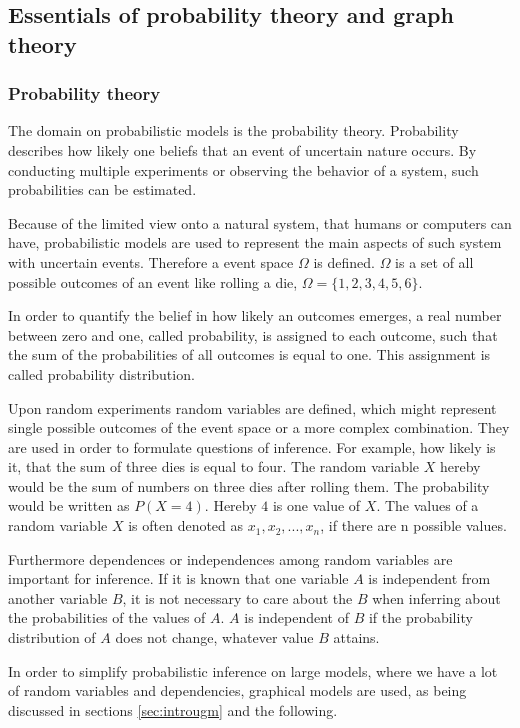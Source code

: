 \subsection{Essentials of probability theory and graph theory}

\subsubsection{Probability theory}

The domain on probabilistic models is the probability theory. Probability describes how likely one beliefs that an event of uncertain nature occurs. By conducting multiple experiments or observing the behavior of a system, such probabilities can be estimated.

Because of the limited view onto a natural system, that humans or computers can have, probabilistic models are used to represent the main aspects of such system with uncertain events. Therefore a event space $\Omega$ is defined. $\Omega$ is a set of all possible outcomes of an event like rolling a die, $\Omega=\{1,2,3,4,5,6\}$.

In order to quantify the belief in how likely an outcomes emerges, a real number between zero and one, called probability, is assigned to each outcome, such that the sum of the probabilities of all outcomes is equal to one. This assignment is called probability distribution.

Upon random experiments random variables are defined, which might represent single possible outcomes of the event space or a more complex combination. They are used in order to formulate questions of inference. For example, how likely is it, that the sum of three dies is equal to four. The random variable $X$ hereby would be the sum of numbers on three dies after rolling them. The probability would be written as $P(X=4)$. Hereby $4$ is one value of $X$. The values of a random variable $X$ is often denoted as $x_1, x_2,  ..., x_n$, if there are n possible values.

Furthermore dependences or independences among random variables are important for inference. If it is known that one variable $A$ is independent from another variable $B$, it is not necessary to care about the $B$ when inferring about the probabilities of the values of $A$. $A$ is independent of $B$ if the probability distribution of $A$ does not change, whatever value $B$ attains.

In order to simplify probabilistic inference on large models, where we have a lot of random variables and dependencies, graphical models are used, as being discussed in sections \ref{sec:introugm} and the following.

